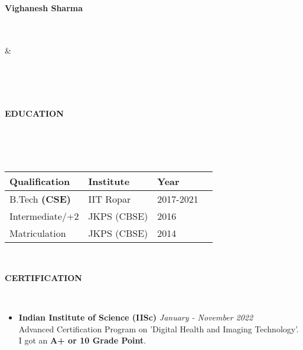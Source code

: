 \documentclass[a4paper,10pt]{article}
\newcommand{\lsep}{-0.6cm}
\newcommand{\resheading}[1]{{\small \colorbox{mygrey}{\begin{minipage}{0.975\textwidth}{\textbf{#1 \vphantom{p\^{E}}}}\end{minipage}}}}
\begin{document}
\hspace{0.5cm}\\[-0.2cm]

\begin{minipage}{0.5\linewidth}
\textbf{\Large Vighanesh Sharma}\\
\\
 \\
\end{minipage}
&
\begin{minipage}{0.5\linewidth}
\\
\\
 \\
\end{minipage}

\resheading{\textbf{EDUCATION} }\\[\lsep]
\\ \\
\indent \begin{tabular}{ l @{\hskip 2.0in} l @{\hskip 2.0in} l @{\hskip .5in} l}
\hline
\textbf{Qualification} & \textbf{Institute} & \textbf{Year}\\
\hline
B.Tech \textbf{(CSE)} & IIT Ropar & 2017-2021\\
Intermediate/+2 & JKPS (CBSE) & 2016\\
Matriculation & JKPS (CBSE)  & 2014\\
\hline
\end{tabular}
\\
\vspace{1.0pt}

\resheading{\textbf{CERTIFICATION} }\\[\lsep]
\vspace{2.0pt}
\begin{itemize}
\item \textbf{Indian Institute of Science (IISc)} \hfill \emph{January - November 2022}\\
Advanced Certification Program on 'Digital Health and Imaging Technology'. I got an \textbf{A+ or 10 Grade Point}. 
\end{itemize}
\end{document}
